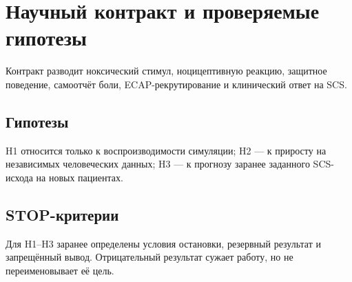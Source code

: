 \chapter{Научный контракт и проверяемые гипотезы}

Контракт разводит ноксический стимул, ноцицептивную реакцию, защитное поведение,
самоотчёт боли, ECAP-рекрутирование и клинический ответ на SCS.

\section{Гипотезы}
H1 относится только к воспроизводимости симуляции; H2 --- к приросту на независимых
человеческих данных; H3 --- к прогнозу заранее заданного SCS-исхода на новых пациентах.

\section{STOP-критерии}
Для H1--H3 заранее определены условия остановки, резервный результат и запрещённый вывод.
Отрицательный результат сужает работу, но не переименовывает её цель.
